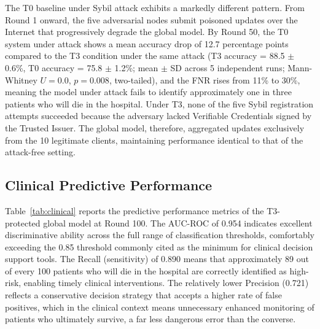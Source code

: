 \documentclass{sbc2023}
\begin{document}
The T0 baseline under Sybil attack exhibits a markedly different pattern. From Round 1 onward, the five adversarial nodes submit poisoned updates over the Internet that progressively degrade the global model. By Round 50, the T0 system under attack shows a mean accuracy drop of 12.7 percentage points compared to the T3 condition under the same attack (T3 accuracy = 88.5 $\pm$ 0.6\%, T0 accuracy = 75.8 $\pm$ 1.2\%; mean $\pm$ SD across 5 independent runs; Mann-Whitney $U = 0.0$, $p = 0.008$, two-tailed), and the FNR rises from 11\% to 30\%, meaning the model under attack fails to identify approximately one in three patients who will die in the hospital. Under T3, none of the five Sybil registration attempts succeeded because the adversary lacked Verifiable Credentials signed by the Trusted Issuer. The global model, therefore, aggregated updates exclusively from the 10 legitimate clients, maintaining performance identical to that of the attack-free setting.

\subsection{Clinical Predictive Performance}

Table~\ref{tab:clinical} reports the predictive performance metrics of the T3-protected global model at Round 100. The AUC-ROC of 0.954 indicates excellent discriminative ability across the full range of classification thresholds, comfortably exceeding the 0.85 threshold commonly cited as the minimum for clinical decision support tools. The Recall (sensitivity) of 0.890 means that approximately 89 out of every 100 patients who will die in the hospital are correctly identified as high-risk, enabling timely clinical interventions. The relatively lower Precision (0.721) reflects a conservative decision strategy that accepts a higher rate of false positives, which in the clinical context means unnecessary enhanced monitoring of patients who ultimately survive, a far less dangerous error than the converse.
\end{document}
